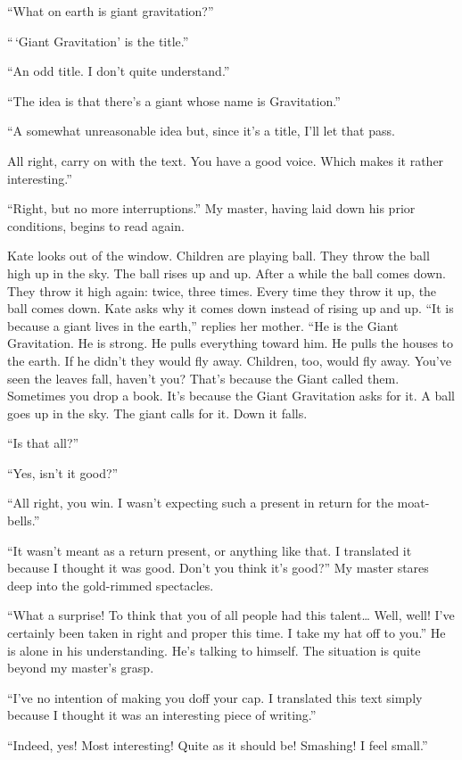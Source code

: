 \documentclass{book}
\begin{document}
``What on earth is giant gravitation?''

``\,`Giant Gravitation' is the title.''

``An odd title. I don't quite understand.''

``The idea is that there's a giant whose name is Gravitation.''

``A somewhat unreasonable idea but, since it's a title, I'll let that
pass.

All right, carry on with the text. You have a good voice. Which makes it
rather interesting.''

``Right, but no more interruptions.'' My master, having laid down his
prior conditions, begins to read again.

Kate looks out of the window. Children are playing ball. They throw the
ball high up in the sky. The ball rises up and up. After a while the
ball comes down. They throw it high again: twice, three times. Every
time they throw it up, the ball comes down. Kate asks why it comes down
instead of rising up and up. ``It is because a giant lives in the
earth,'' replies her mother. ``He is the Giant Gravitation. He is
strong. He pulls everything toward him. He pulls the houses to the
earth. If he didn't they would fly away. Children, too, would fly away.
You've seen the leaves fall, haven't you? That's because the Giant
called them. Sometimes you drop a book. It's because the Giant
Gravitation asks for it. A ball goes up in the sky. The giant calls for
it. Down it falls.

``Is that all?''

``Yes, isn't it good?''

``All right, you win. I wasn't expecting such a present in return for
the moat-bells.''

``It wasn't meant as a return present, or anything like that. I
translated it because I thought it was good. Don't you think it's
good?'' My master stares deep into the gold-rimmed spectacles.

``What a surprise! To think that you of all people had this
talent\ldots{} Well, well! I've certainly been taken in right and proper
this time. I take my hat off to you.'' He is alone in his understanding.
He's talking to himself. The situation is quite beyond my master's
grasp.

``I've no intention of making you doff your cap. I translated this text
simply because I thought it was an interesting piece of writing.''

``Indeed, yes! Most interesting! Quite as it should be! Smashing! I feel
small.''
\end{document}
